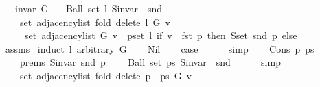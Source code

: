 \begin{isabellebody}
\ \ \ {\isachardoublequoteopen}invar\ G{\isachardoublequoteclose}\isanewline
\ \ \ {\isachardoublequoteopen}Ball\ {\isacharparenleft}{\kern0pt}set\ l{\isacharparenright}{\kern0pt}\ {\isacharparenleft}{\kern0pt}S{\isachardot}{\kern0pt}invar\ {\isasymcirc}\ snd{\isacharparenright}{\kern0pt}{\isachardoublequoteclose}\isanewline
\ \ \isanewline
\ \ \ \ {\isachardoublequoteopen}set\ {\isacharparenleft}{\kern0pt}adjacency{\isacharunderscore}{\kern0pt}list\ {\isacharparenleft}{\kern0pt}fold\ delete{\isacharunderscore}{\kern0pt}{}\ l\ G{\isacharparenright}{\kern0pt}\ v{\isacharparenright}{\kern0pt}\ {\isacharequal}{\kern0pt}\isanewline
\ \ \ \ \ set\ {\isacharparenleft}{\kern0pt}adjacency{\isacharunderscore}{\kern0pt}list\ G\ v{\isacharparenright}{\kern0pt}\ {\isacharminus}{\kern0pt}\ {\isacharparenleft}{\kern0pt}{\isasymUnion}p{\isasymin}set\ l{\isachardot}{\kern0pt}\ if\ v\ {\isacharequal}{\kern0pt}\ fst\ p\ then\ S{\isachardot}{\kern0pt}set\ {\isacharparenleft}{\kern0pt}snd\ p{\isacharparenright}{\kern0pt}\ else\ {\isacharbraceleft}{\kern0pt}{\isacharbraceright}{\kern0pt}{\isacharparenright}{\kern0pt}{\isachardoublequoteclose}\isanewline
%
\isadelimproof
\ \ %
\endisadelimproof
%
\isatagproof
{}\isamarkupfalse%
\ assms\isanewline
{}\isamarkupfalse%
\ {\isacharparenleft}{\kern0pt}induct\ l\ arbitrary{\isacharcolon}{\kern0pt}\ G{\isacharparenright}{\kern0pt}\isanewline
\ \ \isamarkupfalse%
\ Nil\isanewline
\ \ \isamarkupfalse%
\ {\isacharquery}{\kern0pt}case\isanewline
\ \ \ \ \isamarkupfalse%
\ simp\isanewline
{}\isamarkupfalse%
\isanewline
\ \ \isamarkupfalse%
\ {\isacharparenleft}{\kern0pt}Cons\ p\ ps{\isacharparenright}{\kern0pt}\isanewline
\ \ \isamarkupfalse%
\isanewline
\ \ \ \ prems{\isacharcolon}{\kern0pt}\ {\isachardoublequoteopen}S{\isachardot}{\kern0pt}invar\ {\isacharparenleft}{\kern0pt}snd\ p{\isacharparenright}{\kern0pt}{\isachardoublequoteclose}\isanewline
\ \ \ \ {\isachardoublequoteopen}Ball\ {\isacharparenleft}{\kern0pt}set\ ps{\isacharparenright}{\kern0pt}\ {\isacharparenleft}{\kern0pt}S{\isachardot}{\kern0pt}invar\ {\isasymcirc}\ snd{\isacharparenright}{\kern0pt}{\isachardoublequoteclose}\isanewline
\ \ \ \ \isamarkupfalse%
\ simp{\isacharplus}{\kern0pt}\isanewline
\isanewline
\ \ \isamarkupfalse%
\isanewline
\ \ \ \ {\isachardoublequoteopen}set\ {\isacharparenleft}{\kern0pt}adjacency{\isacharunderscore}{\kern0pt}list\ {\isacharparenleft}{\kern0pt}fold\ delete{\isacharunderscore}{\kern0pt}{}\ {\isacharparenleft}{\kern0pt}p\ {\isacharhash}{\kern0pt}\ ps{\isacharparenright}{\kern0pt}\ G{\isacharparenright}{\kern0pt}\ v{\isacharparenright}{\kern0pt}\ {\isacharequal}{\kern0pt}\isanewline

\end{isabellebody}

